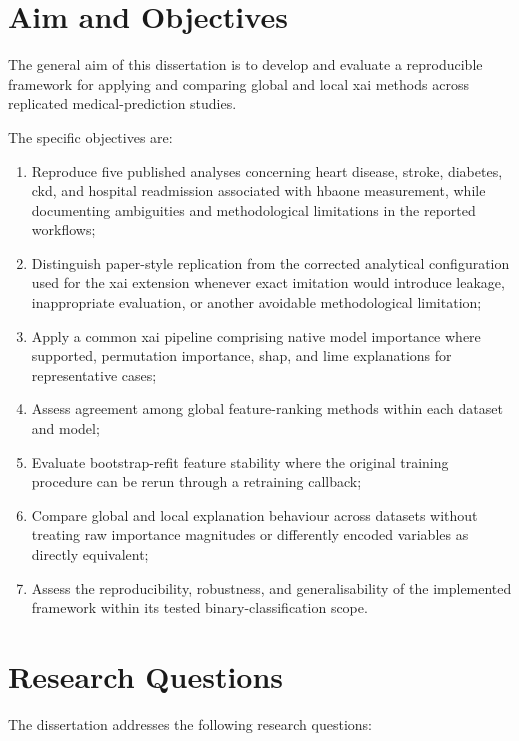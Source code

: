 \section{Aim and Objectives}

The general aim of this dissertation is to develop and evaluate a reproducible framework for applying and comparing global and local \gls{xai} methods across replicated medical-prediction studies.

The specific objectives are:

\begin{enumerate}
    \item Reproduce five published analyses concerning heart disease, stroke, diabetes, \gls{ckd}, and hospital readmission associated with \gls{hbaone} measurement, while documenting ambiguities and methodological limitations in the reported workflows;
    \item Distinguish paper-style replication from the corrected analytical configuration used for the \gls{xai} extension whenever exact imitation would introduce leakage, inappropriate evaluation, or another avoidable methodological limitation;
    \item Apply a common \gls{xai} pipeline comprising native model importance where supported, permutation importance, \gls{shap}, and \gls{lime} explanations for representative cases;
    \item Assess agreement among global feature-ranking methods within each dataset and model;
    \item Evaluate bootstrap-refit feature stability where the original training procedure can be rerun through a retraining callback;
    \item Compare global and local explanation behaviour across datasets without treating raw importance magnitudes or differently encoded variables as directly equivalent;
    \item Assess the reproducibility, robustness, and generalisability of the implemented framework within its tested binary-classification scope.
\end{enumerate}

\section{Research Questions}

The dissertation addresses the following research questions:

